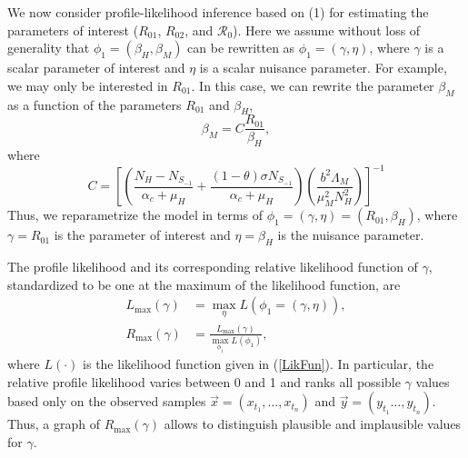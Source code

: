     We now consider profile-likelihood inference based on (1) for
estimating the parameters of interest ($R_{01}$, $R_{02}$, and
$\mathcal{R}_{0}$). Here we assume without loss of generality that
$\phi_{1}=\left(\beta_{H},\beta_{M}\right)$ can be rewritten as
$\phi_{1}=\left(\gamma,\eta\right)$, where $\gamma$ is a scalar
parameter of interest and $\eta$ is a scalar nuisance parameter. For
example, we may only be interested in $R_{01}$. In this case, we can
rewrite the parameter $\beta_{M}$ as a function of the parameters
$R_{01}$ and $\beta_{H}$, 
\begin{equation}
    \beta_{M}=C\frac{R_{01}}{\beta_{H}}, \nonumber
\end{equation}
where
\begin{equation}
    C=\left[\left(\frac{N_H - N_{S_{-1}}}{\alpha_c + \mu_H}
        +\frac{(1- \theta ) \sigma N_{S_{-1}}}{ \alpha_c + \mu_H}\right)
        \left(\frac{b^2\Lambda_M}{\mu_M ^ 2  N_H ^ 2}\right)\right]^{-1} \nonumber
\end{equation}
    Thus, we reparametrize the model in terms of 
$\phi_{1}=\left(\gamma,\eta\right)=\left(R_{01},\beta_{H}\right)$, 
where $\gamma=R_{01}$ is the parameter of interest and 
$\eta=\beta_{H}$ is the nuisance parameter.

    The profile likelihood and its corresponding relative likelihood
function of $\gamma$, standardized to be one at the maximum of the
likelihood function, are 
\begin{equation}
    \begin{split}
        L_{\max}
            \left(
            \gamma\right)&=\max_{\eta}L\left(\phi_{1}=\left(\gamma,\eta \right)
        \right),  \nonumber \\
        R_{\max}
        \left(
            \gamma\right)   
            &=  
                \frac{
                    L_{\max} \left( \gamma \right)
                }{
                    \displaystyle \max_{\phi_{1}
                } L
                \left( 
                    \phi_{1}
                \right)},
    \end{split}
\end{equation}
where $L\left(\cdot\right)$ is the likelihood function given in
(\ref{LikFun}). In particular, the relative profile likelihood varies between
0 and 1 and ranks all possible $\gamma$ values based only on the observed
samples $\vec{x}=\left(x_{t_1}, \dots , x_{t_n} \right)$ and
$\vec{y}=\left(y_{t_1} \dots , y_{t_n} \right)$. Thus, a graph of
$R_{\max}\left(\gamma\right)$ allows to distinguish plausible and implausible
values for $\gamma$.

